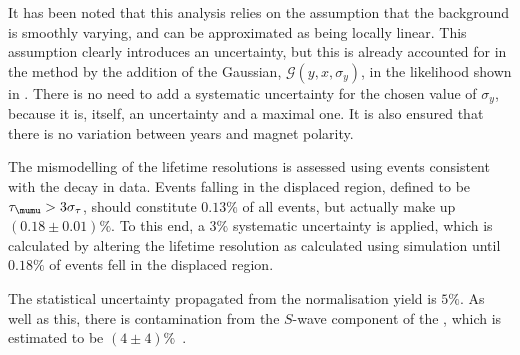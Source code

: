 %


It has been noted that this analysis relies on the assumption that the background is smoothly
varying, and can be approximated as being locally linear.
This assumption clearly introduces an uncertainty, but this is already accounted for in the method
by the addition of the Gaussian, $\mathcal{G}(y, x, \sigma_y)$, in the likelihood shown in
.
There is no need to add a systematic uncertainty for the chosen value of $\sigma_y$, because it is,
itself, an uncertainty and a maximal one.
It is also ensured that there is no variation between years and magnet polarity.

The mismodelling of the lifetime resolutions is assessed using events consistent with the decay
\btojpsikstr in data.
Events falling in the displaced region, defined to be $\tau_{\mumu} > 3\sigma_\tau$, should
constitute $0.13\%$ of all events, but actually make up $(0.18\pm0.01)\%$.
To this end, a $3\%$ systematic uncertainty is applied, which is calculated by altering the
lifetime resolution as calculated using simulation until $0.18\%$ of events fell in the displaced
region.

The statistical uncertainty propagated from the normalisation yield is $5\%$.
As well as this, there is contamination from the $S$-wave component of the \Kstarz, which is
estimated to be $(4\pm4)\%$~\cite{LHCb-PAPER-2013-019}.













